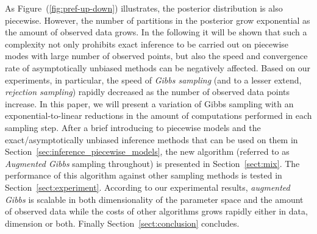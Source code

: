 As Figure~(\ref{fig:pref-up-down}) illustrates, the posterior
distribution is also piecewise.  However, the number of partitions in
the posterior grow exponential as the amount of observed data grows.
In the following it will be shown that such a complexity not only
prohibits exact inference to be carried out on piecewise modes with
large number of observed points, but also the speed and convergence
rate of asymptotically unbiased methods can be negatively affected.
Based on our experiments, in particular, the speed of \emph{Gibbs
  sampling} (and to a lesser extend, \emph{rejection sampling})
rapidly decreased as the number of observed data points increase.  In
this paper, we will present a variation of Gibbs sampling with an
exponential-to-linear reductions in the amount of computations
performed in each sampling step.
After a brief introducing to piecewise models and the
exact/asymptotically unbiased inference methods that can be used on
them in Section~\ref{sec:inference_piecewise_models}, the new
algorithm (referred to as \emph{Augmented Gibbs} sampling throughout)
is presented in Section~\ref{sect:mix}.  The performance of this
algorithm against other sampling methods is tested in
Section~\ref{sect:experiment}.
According to our experimental results, \emph{augmented Gibbs} is
scalable in both dimensionality of the parameter space and the amount
of observed data while the costs of other algorithms grows rapidly
either in data, dimension or both. Finally
Section~\ref{sect:conclusion} concludes.

